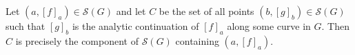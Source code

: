 Let $(a, [f]_a) \in \mathcal{S}(G)$ and let $C$ be the set of all points $(b, [g]_b) \in \mathcal{S}(G)$ such that $[g]_b$ is the analytic continuation of $[f]_a$ along some curve in $G$. Then $C$ is precisely the component of $\mathcal{S}(G)$ containing $(a, [f]_a)$.
